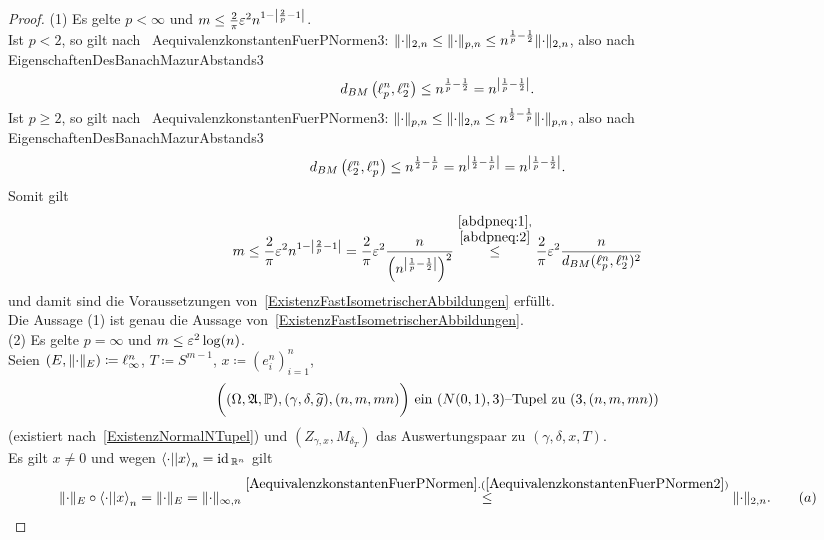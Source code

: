 \begin{proof}
(1) Es gelte $p < \infty$ und
$m\le\frac 2\pi\varepsilon^2 n^{1-\left|\frac2p-1\right|}$.\\
Ist $p < 2$, so gilt nach~
{AequivalenzkonstantenFuerPNormen3}:
$\lVert\cdot\rVert_{2,n}\le\lVert\cdot\rVert_{p,n}\le n^{\frac 1p-\frac 12}\lVert\cdot\rVert_{2,n}$,
also nach~
{EigenschaftenDesBanachMazurAbstands3}
\begin{align}
d_{BM}\left(\ell_p^n, \ell_2^n \right) \le n ^{\frac 1 p - \frac 1 2}
= n ^{\left|\frac 1 p - \frac 1 2\right|}\text.\label{abdpneq:1}
\end{align}
Ist $p \ge 2$, so gilt nach~
{AequivalenzkonstantenFuerPNormen3}:
$\lVert\cdot\rVert_{p,n}\le\lVert\cdot\rVert_{2,n}\le n^{\frac 12-\frac 1p}\lVert\cdot\rVert_{p,n}$,
also nach~
{EigenschaftenDesBanachMazurAbstands3}
\begin{align}
d_{BM}\left(\ell_2^n, \ell_p^n\right) \le n ^{\frac 1 2 - \frac 1 p}
= n ^{\left|\frac 1 2 - \frac 1 p\right|} = n ^{\left|\frac 1 p -\frac 12\right|}\text.
\label{abdpneq:2}
\end{align}
Somit gilt
\[m \le \frac 2 \pi \varepsilon^2 n^{1- \left|\frac 2 p - 1\right|}
= \frac 2 \pi \varepsilon^2 \frac n {\left(n^{\left|\frac 1 p - \frac 1 2\right|}\right)^2}
\overset{\substack{\eqref{abdpneq:1},\\\eqref{abdpneq:2}}}
\le\frac 2 \pi \varepsilon^2 \frac n {d_{BM}(\ell_p^n, \ell_2^n)^2}\]
und damit sind die Voraussetzungen von~\ref{ExistenzFastIsometrischerAbbildungen} erfüllt.\\
Die Aussage (1) ist genau die Aussage von~\ref{ExistenzFastIsometrischerAbbildungen}.\\
(2) Es gelte $p=\infty$ und $m \le \varepsilon^2 \log(n)$.\\
Seien $(E,\lVert\cdot\rVert_E)\coloneqq \ell_\infty^n$, $T\coloneqq S^{m-1}$, $x\coloneqq  (e_i^n)_{i=1}^n$,
\[\bigg((\Omega, \mathfrak{A}, \mathbb{P}), (\gamma,\delta,\widetilde g),(n, m, mn)\bigg)
\text{ ein }(N(0,1), 3)\text{--Tupel zu }(3,(n,m,mn))\] (existiert nach~\ref{ExistenzNormalNTupel}) und $(Z_{\gamma, x}, M_{\delta_T})$ das
Auswertungspaar zu $(\gamma, \delta, x, T)$.\\
Es gilt $x \neq 0$ und wegen $\left\langle \cdot ||x\right\rangle_n = \text{id}\,_{\mathbb{R}^n}$ gilt
\begin{align}\norm\cdot_E \circ\bprod \cdot x _n
= \norm\cdot_E = \norm\cdot_{\infty, n}
\overset{\refclaim{AequivalenzkonstantenFuerPNormen}
{AequivalenzkonstantenFuerPNormen2}}\le \norm\cdot_{2, n}\text. \tag {$a$}

\end{align}
\end{proof}
